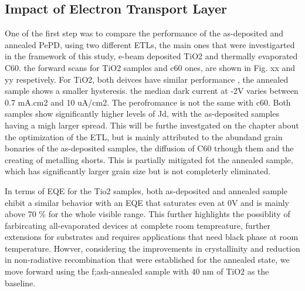 \subsection{Impact of Electron Transport Layer}

One of the first step was to compare the performance of the as-deposited and annealed PePD, using two different ETLs, the main ones that were investigarted in the framework of this study, e-beam deposited TiO2 and thermally evaporated C60. the forward scans for TiO2 samples and c60 ones, are shown in Fig. xx and yy respetively. For TiO2, both deivces have similar performance , the annealed sample shows a smaller hysteresis. the median dark current at -2V varies between 0.7 mA.cm2 and 10 uA/cm2. The perofromance is not the same with c60. Both samples show significantly higher levels of Jd, with the as-deposited samples having a migh larger spread. This will be furthe investgated on the chapter about the optimization of the ETL, but is mainly attributed to the abundand grain bonaries of the as-deposited samples, the diffusion of C60 trhough them and the creating of metalling shorts. This is partially mitigated fot the annealed sample, which has significantly larger grain size but is not completerly eliminated. 

In terms of EQE for the Tio2 samples, both as-deposited and annealed sample ehibit a similar behavior with an EQE that saturates even at 0V and is mainly above 70 \% for the whole visible range. This further highlights the possiblity of farbircating all-evaporated devices at complete room tempreature, further extensions for substrates and requires applications that need black phase at room temperature. Howver, considering the improvements in crystallinity and reduction in non-radiative recombination that were established for the annealed state, we move forward using the f;ash-annealed sample with 40 nm of TiO2 as the baseline. 




